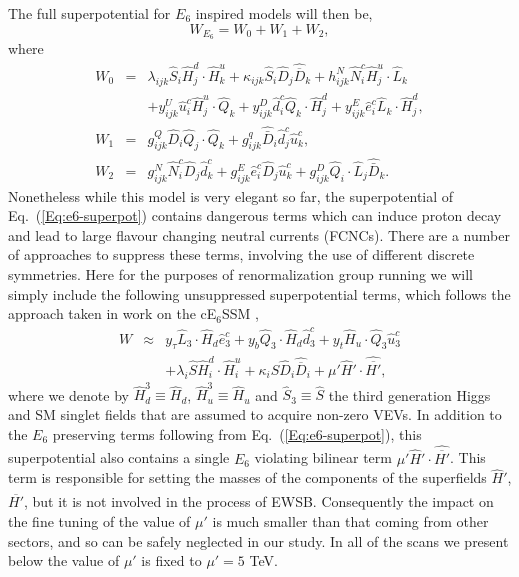 \documentclass[preprint,amsmath,amssymb,aps,superscriptaddress,prd,
showpacs,floatfix,nofootinbib]{revtex4-1}
\newcommand{\be}{\begin{equation}}
\newcommand{\ee}{\end{equation}}
\newcommand{\ba}{\begin{eqnarray}}
\newcommand{\ea}{\end{eqnarray}}
\newcommand{\SuperField}[1]{\hat{#1}}
\begin{document}
The full superpotential for $E_6$ inspired models will then be,
\be
W_{E_6} = W_0 + W_1 + W_2 , \label{Eq:e6-superpot}
\ee
where
\begin{eqnarray}
W_0 &=& \lambda_{ijk} \hat{S}_i \hat{H}^d_{j} \cdot\hat{H}^u_{k} +
\kappa_{ijk} \hat{S}_i \hat{D}_j \hat{\overline{D}}_k + h^N_{ijk} \hat{N}^c_i
\hat{H}^u_{j} \cdot \hat{L}_k \nonumber \\
& & + y^U_{ijk} \hat{u}^c_i \hat{H}^u_{j} \cdot \hat{Q}_k + y^D_{ijk}
\hat{d}^c_i \hat{Q}_k \cdot \hat{H}^d_{j} + y^E_{ijk} \hat{e}^c_i \hat{L}_k
\cdot\hat{H}^d_{j} , \\
W_1 &=& g^Q_{ijk} \hat{D}_i \hat{Q}_j \cdot \hat{Q}_k + g^q_{ijk}
\hat{\bar{D}}_i \hat{d}^c_j \hat{u}^c_k , \\
W_2 &=& g^N_{ijk} \hat{N}^c_i \hat{D}_j \hat{d}^c_k + g^E_{ijk} \hat{e}^c_i
\hat{D}_j \hat{u}^c_k + g^D_{ijk} \hat{Q}_i \cdot \hat{L}_j \hat{\bar{D}}_k .
\label{Eq:e6-superpot-parts}
\end{eqnarray}
Nonetheless while this model is very elegant so far, the
superpotential of Eq.~(\ref{Eq:e6-superpot}) contains dangerous terms which
can induce proton decay and lead to large flavour changing neutral
currents (FCNCs).  There are a number of approaches to suppress these
terms, involving the use of different discrete symmetries.  Here for
the purposes of renormalization group running we will simply include
the following unsuppressed superpotential terms, which follows the
approach taken in work on the cE$_6$SSM \cite{Athron:2009ue, Athron:2009bs},
%
    \ba
    W &\approx& y_{\tau} \SuperField{L}_3 \cdot \SuperField{H}_d
      \SuperField{e}^c_3 + y_b \SuperField{Q}_3\cdot\SuperField{H}_d
      \SuperField{d}_3^c + y_t \SuperField{H}_u\cdot\SuperField{Q}_3
      \SuperField{u}_3^c\nonumber\\
    &&
    + \lambda_i \SuperField{S} \SuperField{H}_i^d
    \cdot \SuperField{H}_i^u  + \kappa_i \SuperField{S} \SuperField{D}_i
    \SuperField{\overline{D}}_i + \mu' \SuperField{H}'\cdot
    \SuperField{\overline{H'}},
    \ea
  \label{SuPot_RGE}
%
where we denote by $\SuperField{H}_d^3 \equiv \SuperField{H}_d$,
$\SuperField{H}_u^3 \equiv \SuperField{H}_u$ and $\SuperField{S}_3 \equiv
\SuperField{S}$ the third generation Higgs and SM singlet fields that are
assumed to acquire non-zero VEVs.  In addition to the $E_6$ preserving terms
following from Eq.~(\ref{Eq:e6-superpot}), this superpotential also contains a
single $E_6$ violating bilinear term $\mu' \SuperField{H}'\cdot
\SuperField{\overline{H'}}$.  This term is responsible for setting the masses of
the components of the superfields $\SuperField{H}'$,
$\SuperField{\overline{H'}}$, but it is not involved in the process of EWSB.
Consequently the impact on the fine tuning of the value of $\mu'$ is much
smaller than that coming from other sectors, and so can be safely neglected in
our study. In all of the scans we present below the value of $\mu'$ is fixed
to $\mu' = 5$ TeV.
\end{document}
